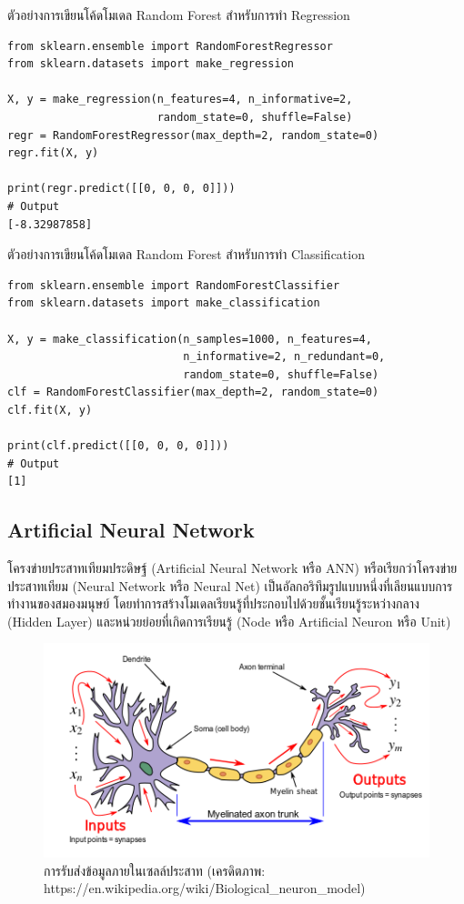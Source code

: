 \noindent ตัวอย่างการเขียนโค้ดโมเดล Random Forest สำหรับการทำ Regression
%
\begin{lstlisting}[style=MyPython]
from sklearn.ensemble import RandomForestRegressor
from sklearn.datasets import make_regression

X, y = make_regression(n_features=4, n_informative=2,
                       random_state=0, shuffle=False)
regr = RandomForestRegressor(max_depth=2, random_state=0)
regr.fit(X, y)

print(regr.predict([[0, 0, 0, 0]]))
# Output
[-8.32987858]
\end{lstlisting}

\vspace{1em}

\noindent ตัวอย่างการเขียนโค้ดโมเดล Random Forest สำหรับการทำ Classification
%
\begin{lstlisting}[style=MyPython]
from sklearn.ensemble import RandomForestClassifier
from sklearn.datasets import make_classification

X, y = make_classification(n_samples=1000, n_features=4,
                           n_informative=2, n_redundant=0,
                           random_state=0, shuffle=False)
clf = RandomForestClassifier(max_depth=2, random_state=0)
clf.fit(X, y)

print(clf.predict([[0, 0, 0, 0]]))
# Output
[1]
\end{lstlisting}

\subsection{Artificial Neural Network}
\label{ssec:ann}

โครงข่ายประสาทเทียมประดิษฐ์ (Artificial Neural Network หรือ ANN) หรือเรียกว่าโครงข่ายประสาทเทียม (Neural Network หรือ Neural Net) เป็นอัลกอริทึมรูปแบบหนึ่งที่เลียนแบบการทำงานของสมองมนุษย์ โดยทำการสร้างโมเดลเรียนรู้ที่ประกอบไปด้วยชั้นเรียนรู้ระหว่างกลาง (Hidden Layer) และหน่วยย่อยที่เกิดการเรียนรู้ (Node หรือ Artificial Neuron หรือ Unit)

\begin{figure}[H]
    \centering
    \includegraphics[width=0.8\linewidth]{fig/neuron.png}
    \caption{การรับส่งข้อมูลภายในเซลล์ประสาท (เครดิตภาพ: https://en.wikipedia.org/wiki/Biological\_neuron\_model)}
    \label{fig:neuron}
\end{figure}

